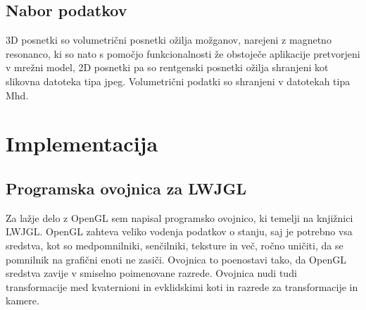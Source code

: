 \documentclass[a4paper, 12pt]{book}
\begin{document}
\section{Nabor podatkov}
3D posnetki so volumetrični posnetki ožilja možganov, narejeni z magnetno resonanco, ki so nato s pomočjo funkcionalnosti že obstoječe aplikacije pretvorjeni v mrežni model, 2D posnetki pa so rentgenski posnetki ožilja shranjeni kot slikovna datoteka tipa jpeg\cite{jpeg}. Volumetrični podatki so shranjeni v datotekah tipa Mhd\cite{mhd}.

\chapter{Implementacija}
\section{Programska ovojnica za LWJGL}

Za lažje delo z OpenGL sem napisal programsko ovojnico, ki temelji na knjižnici LWJGL. OpenGL zahteva veliko vodenja podatkov o stanju, saj je potrebno vsa sredstva, kot so medpomnilniki, senčilniki, teksture in več, ročno uničiti, da se pomnilnik na grafični enoti ne zasiči. Ovojnica to poenostavi tako, da OpenGL sredstva zavije v smiselno poimenovane razrede. Ovojnica nudi tudi transformacije med kvaternioni in evklidskimi koti in razrede za transformacije in kamere.
\end{document}
